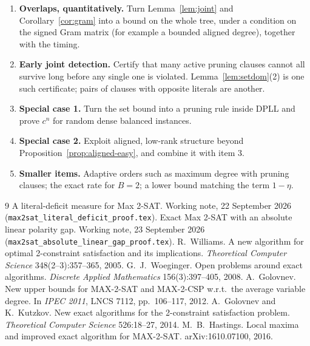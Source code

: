 \documentclass[11pt,a4paper]{article}
\theoremstyle{remark}
\begin{document}
\begin{enumerate}
 \item \textbf{Overlaps, quantitatively.} Turn Lemma~\ref{lem:joint} and
 Corollary~\ref{cor:gram} into a bound on the whole tree, under a condition on
 the signed Gram matrix (for example a bounded aligned degree), together with
 the timing.
 \item \textbf{Early joint detection.} Certify that many active pruning clauses
 cannot all survive long before any single one is violated.
 Lemma~\ref{lem:setdom}(2) is one such certificate; pairs of clauses with
 opposite literals are another.
 \item \textbf{Special case 1.} Turn the set bound into a pruning rule inside
 DPLL and prove $c^n$ for random dense balanced instances.
 \item \textbf{Special case 2.} Exploit aligned, low-rank structure beyond
 Proposition~\ref{prop:aligned-easy}, and combine it with item 3.
 \item \textbf{Smaller items.} Adaptive orders such as maximum degree with
 pruning clauses; the exact rate for $B=2$; a lower bound matching the term
 $1-\eta$.
\end{enumerate}

\begin{thebibliography}{9}
 A literal-deficit measure for Max 2-SAT. Working note,
 22 September 2026 (\texttt{max2sat\_literal\_deficit\_proof.tex}).
 Exact Max 2-SAT with an absolute linear polarity gap. Working
 note, 23 September 2026 (\texttt{max2sat\_absolute\_linear\_gap\_proof.tex}).
 R.~Williams. A new algorithm for optimal 2-constraint
 satisfaction and its implications. \emph{Theoretical Computer Science}
 348(2--3):357--365, 2005.
 G.~J.~Woeginger. Open problems around exact algorithms.
 \emph{Discrete Applied Mathematics} 156(3):397--405, 2008.
 A.~Golovnev. New upper bounds for MAX-2-SAT and MAX-2-CSP
 w.r.t.\ the average variable degree. In \emph{IPEC 2011}, LNCS 7112,
 pp.~106--117, 2012.
 A.~Golovnev and K.~Kutzkov. New exact algorithms for the
 2-constraint satisfaction problem. \emph{Theoretical Computer Science}
 526:18--27, 2014.
 M.~B.~Hastings. Local maxima and improved exact algorithm for
 MAX-2-SAT. arXiv:1610.07100, 2016.
\end{thebibliography}
\end{document}
